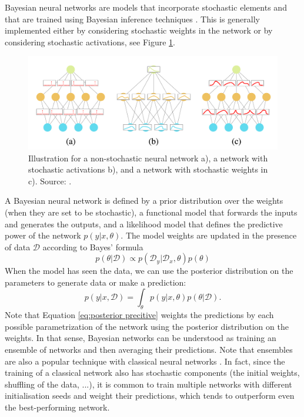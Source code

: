 Bayesian neural networks are models that incorporate stochastic elements and that are trained using Bayesian inference techniques \cite{BNN_review}. This is generally implemented either by considering stochastic weights in the network or by considering 
stochastic activations, see Figure \ref{fig:ML BNN ilus}.

\begin{figure}
    \centering
    \includegraphics[width=0.9\linewidth]{img/ML/scheme_bnn.png}
    \caption{Illustration for a non-stochastic neural network a), a network with stochastic activations b), and a network with stochastic weights in c). Source: \cite{BNN_review}.}
    \label{fig:ML BNN ilus}
\end{figure}
A Bayesian neural network is defined by a prior distribution over the weights (when they are set to be stochastic), a functional model that forwards the inputs and generates the outputs, and a likelihood model that defines the predictive power of the network $p(y|x,\theta)$. The model weights are updated in the presence of data $\mathcal{D}$ according to Bayes' formula
\begin{equation}
    p(\theta|\mathcal{D}) \propto p(\mathcal{D}_y|\mathcal{D}_x, \theta)p(\theta)
\end{equation}
When the model has seen the data, we can use the posterior distribution on the parameters to generate data or make a prediction:
\begin{equation}\label{eq:posterior precitive}
    p(y|x,\mathcal{D})=\int_\theta p(y|x,\theta)p(\theta|\mathcal{D}).
\end{equation}
Note that Equation \ref{eq:posterior precitive} weights the predictions by each possible parametrization of the network using the posterior distribution on the weights. In that sense, Bayesian networks can be understood as training an ensemble of networks and then averaging their predictions. Note that ensembles are also a popular technique with classical neural networks \cite{ensemble}. In fact, since the training of a classical network also has stochastic components (the initial weights, shuffling of the data, ...), it is common to train multiple networks with different initialisation seeds and weight their predictions, which tends to outperform even the best-performing network.

